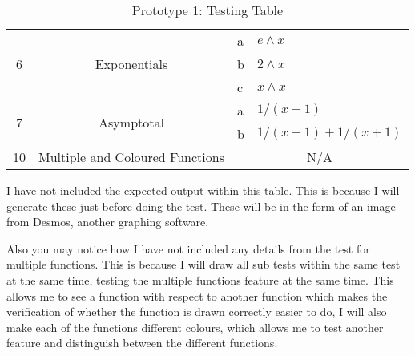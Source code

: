 \documentclass[../../../../main.tex]{subfiles}
\begin{document}
\begin{table}[H]
\begin{tabular}{|c|c|l|l|}
\multirow{3}{*}{6} & \multirow{3}{*}{Exponentials}                              & a                                    & $e\wedge x$               \\ \cline{3-4} 
                   &                                                            & b                                    & $2\wedge x$               \\ \cline{3-4} 
                   &                                                            & c                                    & $x\wedge x$               \\ \hline
\multirow{2}{*}{7} & \multirow{2}{*}{Asymptotal}                                & a                                    & $1/(x-1)$           \\ \cline{3-4} 
                   &                                                            & b                                    & $1/(x-1) + 1/(x+1)$ \\ \hline
10                 & Multiple and Coloured Functions                            & \multicolumn{2}{c|}{N/A}                                   \\ \hline
\end{tabular}
\caption{Prototype 1: Testing Table}
\end{table}

I have not included the expected output within this table. This is because I will generate these just before doing the test. These will be in the form of an image from Desmos, another graphing software.


Also you may notice how I have not included any details from the test for multiple functions. This is because I will draw all sub tests within the same test at the same time, testing the multiple functions feature at the same time. This allows me to see a function with respect to another function which makes the verification of whether the function is drawn correctly easier to do, I will also make each of the functions different colours, which allows me to test another feature and distinguish between the different functions.
\newpage
\end{document}
